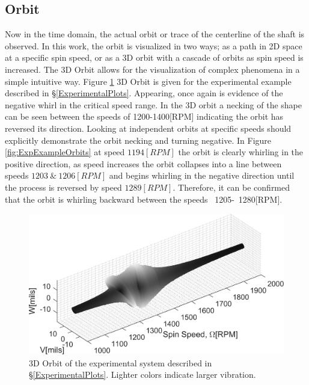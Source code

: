 \subsection{Orbit}
Now in the time domain, the actual orbit or trace of the centerline of the shaft is observed. In this work, the orbit is visualized in two ways; as a path in 2D space at a specific spin speed, or as a 3D orbit with a cascade of orbits as spin speed is increased. The 3D Orbit allows for the visualization of complex phenomena in a simple intuitive way. Figure \ref{fig:ExpExample3DOrbit} 3D Orbit is given for the experimental example described in \S\ref{ExperimentalPlots}. Appearing, once again is evidence of the negative whirl in the critical speed range. In the 3D orbit a necking of the shape can be seen between the speeds of 1200-1400[RPM] indicating the orbit has reversed its direction. Looking at independent orbits at specific speeds should explicitly demonstrate the orbit necking and turning negative. In Figure \ref{fig:ExpExampleOrbits} at speed $ 1194[RPM] $ the orbit is clearly whirling in the positive direction, as speed increases the orbit collapses into a line between speeds $ 1203\ \&\ 1206[RPM] $ and begins whirling in the negative direction until the process is reversed by speed $ 1289[RPM] $. Therefore, it can be confirmed that the orbit is whirling backward between the speeds ~1205-~1280[RPM].\par
\begin{figure}
	\centering
	\includegraphics[width=\linewidth]{./figures/ExpExampleOrbit3D.png}
	\caption{3D Orbit of the experimental system described in \S\ref{ExperimentalPlots}. Lighter colors indicate larger vibration.}
	\label{fig:ExpExample3DOrbit}
\end{figure}
